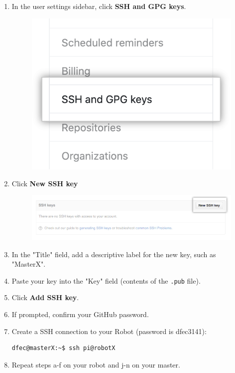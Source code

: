 \documentclass{handout}
\begin{document}
\begin{enumerate}
\begin{enumerate}
		\item In the user settings sidebar, click \textbf{SSH and GPG keys}.
		\begin{figure}[H]
			\centering
			\includegraphics[width=.25\textwidth]{settings-sidebar-ssh-keys.PNG}
		\end{figure}
		\item Click \textbf{New SSH key}
		\begin{figure}[H]
			\centering
			\includegraphics[width=.5\textwidth]{ssh-add-ssh-key.png}
		\end{figure}
		\item In the "Title" field, add a descriptive label for the new key, such as "MasterX".
		\item Paste your key into the "Key" field (contents of the \texttt{.pub} file).
		\item Click \textbf{Add SSH key}.
		\item If prompted, confirm your GitHub password.
		\item Create a SSH connection to your Robot (password is dfec3141):
\begin{lstlisting}[language=bash]
dfec@masterX:~$ ssh pi@robotX
\end{lstlisting}
		\item Repeat steps a-f on your robot and j-n on your master.
	\end{enumerate}
\end{enumerate}
\end{document}
